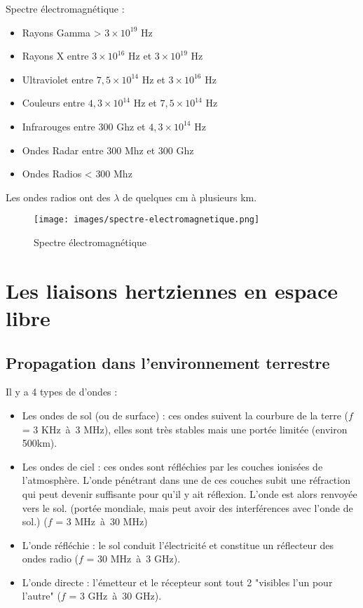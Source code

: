 \documentclass[a4paper]{article}
\begin{document}
Spectre électromagnétique :
\begin{itemize}
  \item Rayons Gamma > $3\times10^{19}$ Hz
  \item Rayons X entre $3\times10^{16}$ Hz et $3\times10^{19}$ Hz
  \item Ultraviolet entre $7,5\times10^{14}$ Hz et $3\times10^{16}$ Hz
  \item Couleurs entre $4,3\times10^{14}$ Hz et $7,5\times10^{14}$ Hz
  \item Infrarouges entre $300$ Ghz et $4,3\times10^{14}$ Hz
  \item Ondes Radar entre $300$ Mhz et $300$ Ghz
  \item Ondes Radios < $300$ Mhz
\end{itemize}
Les ondes radios ont des $\lambda$ de quelques cm à plusieurs km.

\begin{figure}[H]
    \centering
    \texttt{[image: images/spectre-electromagnetique.png]}
    \caption{Spectre électromagnétique}
\end{figure}











\section{Les liaisons hertziennes en espace libre}
\subsection{Propagation dans l'environnement terrestre}
Il y a 4 types de d'ondes :
\begin{itemize}
  \item Les ondes de sol (ou de surface) : ces ondes suivent la courbure
  de la terre ($f$ = 3 KHz\ à\ 3 MHz), elles sont très stables mais une portée limitée (environ 500km).
  \item Les ondes de ciel : ces ondes sont réfléchies par les couches
  ionisées de l'atmosphère. L'onde pénétrant dans une de ces
  couches subit une réfraction qui peut devenir suffisante pour qu'il
  y ait réflexion. L'onde est alors renvoyée vers le sol.
  (portée mondiale, mais peut avoir des interférences avec l'onde de sol.) ($f$ = 3 MHz\ à\ 30 MHz)
  \item L'onde réfléchie : le sol conduit l'électricité et constitue un
  réflecteur des ondes radio ($f$ = 30 MHz\ à\ 3 GHz).
  \item L'onde directe : l'émetteur et le récepteur sont tout 2 "visibles l'un pour l'autre" ($f$ = 3 GHz\ à\ 30 GHz).
\end{itemize}
\end{document}
